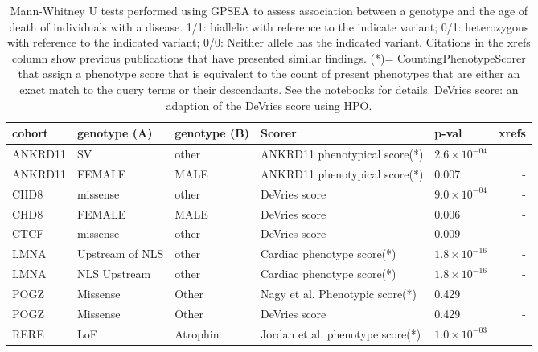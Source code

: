\documentclass[12pt]{article}
\begin{document}
\begin{table}
\centering
\begin{tabular}{lp{3.5cm}p{3.5cm}>{\raggedright}p{3cm}lr}
\toprule
\textbf{cohort} & \textbf{genotype (A)} & \textbf{genotype (B)} & \textbf{Scorer} & \textbf{p-val} & \textbf{xrefs}\\
\midrule
ANKRD11 & SV & other & ANKRD11 phenotypical score(*) & $2.6 \times 10^{-04}$ & \cite{PMID_36446582}\\
ANKRD11 & FEMALE & MALE & ANKRD11 phenotypical score(*) & 0.007 & -\\
CHD8 & missense & other & DeVries score & $9.0 \times 10^{-04}$ & -\\
CHD8 & FEMALE & MALE & DeVries score & 0.006 & -\\
CTCF & missense & other & DeVries score & 0.009 & -\\
LMNA & Upstream of NLS & other & Cardiac phenotype score(*) & $1.8 \times 10^{-16}$ & -\\
LMNA & NLS Upstream & other & Cardiac phenotype score(*)& $1.8 \times 10^{-16}$ & -\\
POGZ & Missense & Other &  Nagy et al. Phenotypic  score(*)  & 0.429 & \cite{PMID_35052493}\\
POGZ & Missense & Other &  DeVries score & 0.429 & -\\
RERE & LoF & Atrophin & Jordan et al.  phenotype score(*)  & $1.0 \times 10^{-03}$ & \cite{PMID_29330883}\\
\bottomrule
\end{tabular}
\caption{Mann-Whitney U tests performed using GPSEA to assess association between a genotype and the age of
    death of individuals with a disease. 1/1: biallelic with reference to the indicate variant; 
    0/1: heterozygous with reference to the indicated variant; 0/0: Neither allele has the indicated variant.
    Citations in the xrefs column show previous publications that have presented similar findings. (*)= CountingPhenotypeScorer that assign a phenotype score that is equivalent to the count of present phenotypes that are either an exact match to the query terms or their descendants. See the notebooks for details. DeVries score: an adaption of the DeVries score \cite{PMID_34521999} using HPO.}
\label{tab:to_do}
\end{table}

\clearpage
\newpage
\end{document}
